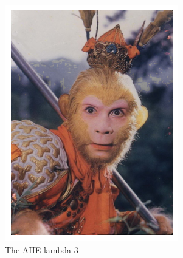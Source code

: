 \documentclass{article}
\begin{document}
	\begin{figure}[!h]
		\includegraphics[width=\linewidth]{img/ahe_lamb_3.png}
		\caption{The AHE lambda 3}
		\label{fig:ahe_lamb_3}
	\end{figure}
	
\end{document}
